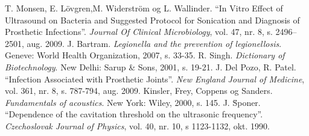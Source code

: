 \begin{thebibliography}{99} 
T. Monsen, E. Lövgren,M. Widerström og L. Wallinder. ``In Vitro Effect of Ultrasound on Bacteria and Suggested Protocol for Sonication and Diagnosis of Prosthetic Infections''. \textit{Journal Of Clinical Microbiology}, vol. 47, nr. 8, s. 2496–2501, aug. 2009.
J. Bartram. \textit{Legionella and the prevention of legionellosis}. Geneve: World Health Organization, 2007, s. 33-35.
R. Singh. \textit{Dictionary of Biotechnology}. New Delhi: Sarup \& Sons, 2001, s. 19-21.
J. Del Pozo, R. Patel. ``Infection Associated with Prosthetic Joints''. \textit{New England Journal of Medicine}, vol. 361, nr. 8, s. 787-794, aug. 2009.
Kinsler, Frey, Coppens og Sanders. \textit{Fundamentals of acoustics}. New York: Wiley, 2000, s. 145.
J. \u{S}poner. ``Dependence of the cavitation threshold on the ultrasonic frequency''. \textit{Czechoslovak Journal of Physics}, vol. 40, nr. 10, s 1123-1132, okt. 1990.

\end{thebibliography}
